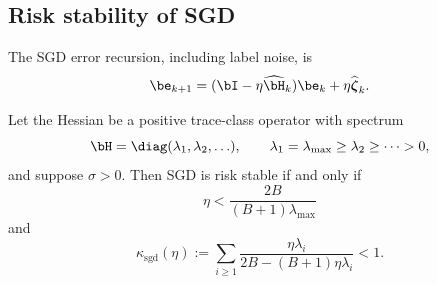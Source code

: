 \documentclass[11pt]{article}
\newcommand{\sgd}{\mathrm{sgd}}
\begin{document}
\subsection{Risk stability of SGD}
\label{app:subsec:sgd-stability}

The SGD error recursion, including label noise, is
\begin{equation}
\label{app:eq:sgd-stability-recursion}
\be_{k+1}
=
(\bI-\eta\widehat{\bH}_k)\be_k
+
\eta\widehat{\boldsymbol\zeta}_k.
\end{equation}

\begin{theorem}
\label{app:thm:sgd-stability}
Let the Hessian be a positive trace-class operator with spectrum
\[
\bH=\diag(\lambda_1,\lambda_2,\ldots),
\qquad
\lambda_1=\lambda_{\max}\geq\lambda_2\geq\cdots>0,
\]
and suppose
\(\sigma>0.\)
Then SGD is risk stable if and only if
\begin{equation}
\label{app:eq:sgd-local-stability}
\eta<\frac{2B}{(B+1)\lambda_{\max}}
\end{equation}
and
\begin{equation}
\label{app:eq:sgd-global-stability}
\kappa_{\sgd}(\eta)
:=
\sum_{i\geq1}
\frac{\eta\lambda_i}{2B-(B+1)\eta\lambda_i}
<1.
\end{equation}
\end{theorem}
\end{document}
